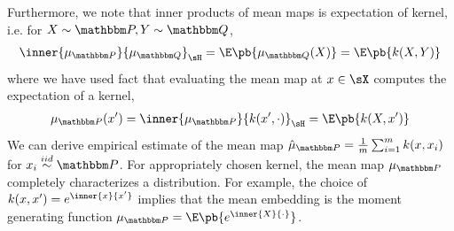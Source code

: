 \documentclass[11pt]{article}
\begin{document}
Furthermore, we note that inner products of mean maps is expectation of kernel, i.e. for $X\sim\bbP,Y\sim\bbQ$,
\begin{align}
    \inner{\mu_{\bbP}}{\mu_{\bbQ}}_{\sH}
        = \E\pb{\mu_{\bbQ}(X)}
        = \E\pb{ k(X,Y) }
\end{align}
where we have used fact that evaluating the mean map at $x\in\sX$ computes the expectation of a kernel,
\begin{align}
    \mu_{\bbP}(x')
        = \inner{\mu_{\bbP}}{k(x',\cdot)}_{\sH}
        = \E\pb{k(X,x')}
\end{align}
We can derive empirical estimate of the mean map $\hat{\mu}_{\bbP} = \frac{1}{m}\sum_{i=1}^m k(x,x_i)$ for $x_i \overset{iid}{\sim} \bbP$. For appropriately chosen kernel, the mean map $\mu_{\bbP}$ completely characterizes a distribution. For example, the choice of $k(x,x') = e^{\inner{x}{x'}}$ implies that the mean embedding is the moment generating function $\mu_{\bbP} = \E\pb{e^{\inner{X}{\cdot}}}$.
 



\newpage
\printbibliography 
\end{document}
